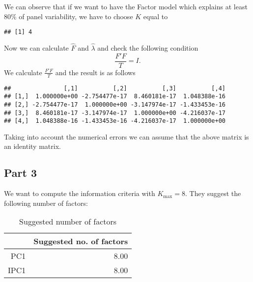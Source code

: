 \documentclass[12pt, a4paper]{article}\usepackage[]{graphicx}\usepackage[]{color}
\makeatletter
\newenvironment{kframe}{%
 \def\at@end@of@kframe{}%
 \ifinner\ifhmode%
  \def\at@end@of@kframe{\end{minipage}}%
  \begin{minipage}{\columnwidth}%
 \fi\fi%
 \def\FrameCommand##1{\hskip\@totalleftmargin \hskip-\fboxsep
 \colorbox{shadecolor}{##1}\hskip-\fboxsep
     \hskip-\linewidth \hskip-\@totalleftmargin \hskip\columnwidth}%
 \MakeFramed {\advance\hsize-\width
   \@totalleftmargin\z@ \linewidth\hsize
   \@setminipage}}%
 {\par\unskip\endMakeFramed%
 \at@end@of@kframe}
\newenvironment{knitrout}{}{} %
\makeatother
\begin{document}
We can observe that if we want to have the Factor model which explains at least $80\%$ of panel variability, we have to choose $K$ equal to

\begin{knitrout}
\color{fgcolor}\begin{kframe}
\begin{verbatim}
## [1] 4
\end{verbatim}
\end{kframe}
\end{knitrout}

Now we can calculate $\hat{F}$ and $\hat{\lambda}$ and check the following condition
\[ \frac{F'F}{T}=I. \]
We calculate $\frac{F'F}{T}$ and the result is as follows
\begin{knitrout}
\color{fgcolor}\begin{kframe}
\begin{verbatim}
##               [,1]          [,2]          [,3]          [,4]
## [1,]  1.000000e+00 -2.754477e-17  8.460181e-17  1.048388e-16
## [2,] -2.754477e-17  1.000000e+00 -3.147974e-17 -1.433453e-16
## [3,]  8.460181e-17 -3.147974e-17  1.000000e+00 -4.216037e-17
## [4,]  1.048388e-16 -1.433453e-16 -4.216037e-17  1.000000e+00
\end{verbatim}
\end{kframe}
\end{knitrout}
Taking into account the numerical errors we can assume that the above matrix is an identity matrix.




\subsection{Part 3}
We want to compute the information criteria with $K_\text{max}=8$. They suggest the following number of factors:
\begin{table}[H]
\centering
\begin{tabular}{rr}
  \hline
  & Suggested no. of factors \\ 
  \hline
PC1 & 8.00 \\ 
  IPC1 & 8.00 \\ 
   \hline
\end{tabular}
\caption{Suggested number of factors} 
\label{tab:2.3.factors}
\end{table}
\end{document}
